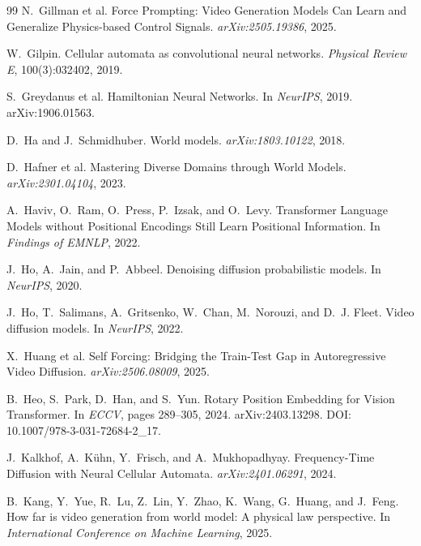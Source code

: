 \documentclass[11pt]{article}
\begin{document}
\begin{thebibliography}{99}
N.~Gillman et al.
Force Prompting: Video Generation Models Can Learn and Generalize Physics-based Control Signals. \emph{arXiv:2505.19386}, 2025.

W.~Gilpin.
Cellular automata as convolutional neural networks.
\emph{Physical Review E}, 100(3):032402, 2019.

S.~Greydanus et al.
Hamiltonian Neural Networks. In \emph{NeurIPS}, 2019. arXiv:1906.01563.

D.~Ha and J.~Schmidhuber.
World models. \emph{arXiv:1803.10122}, 2018.

D.~Hafner et al.
Mastering Diverse Domains through World Models. \emph{arXiv:2301.04104}, 2023.

A.~Haviv, O.~Ram, O.~Press, P.~Izsak, and O.~Levy.
Transformer Language Models without Positional Encodings Still Learn Positional Information. In \emph{Findings of EMNLP}, 2022.

J.~Ho, A.~Jain, and P.~Abbeel.
Denoising diffusion probabilistic models. In \emph{NeurIPS}, 2020.

J.~Ho, T.~Salimans, A.~Gritsenko, W.~Chan, M.~Norouzi, and D.~J. Fleet.
Video diffusion models. In \emph{NeurIPS}, 2022.

X.~Huang et al.
Self Forcing: Bridging the Train-Test Gap in Autoregressive Video Diffusion. \emph{arXiv:2506.08009}, 2025.

B.~Heo, S.~Park, D.~Han, and S.~Yun.
Rotary Position Embedding for Vision Transformer. In \emph{ECCV},
pages 289--305, 2024. arXiv:2403.13298.
DOI: 10.1007/978-3-031-72684-2\_17.

J.~Kalkhof, A.~K{\"u}hn, Y.~Frisch, and A.~Mukhopadhyay.
Frequency-Time Diffusion with Neural Cellular Automata. \emph{arXiv:2401.06291}, 2024.

B.~Kang, Y.~Yue, R.~Lu, Z.~Lin, Y.~Zhao, K.~Wang, G.~Huang, and J.~Feng.
How far is video generation from world model: A physical law perspective.
In \emph{International Conference on Machine Learning}, 2025.


\end{thebibliography}
\end{document}
